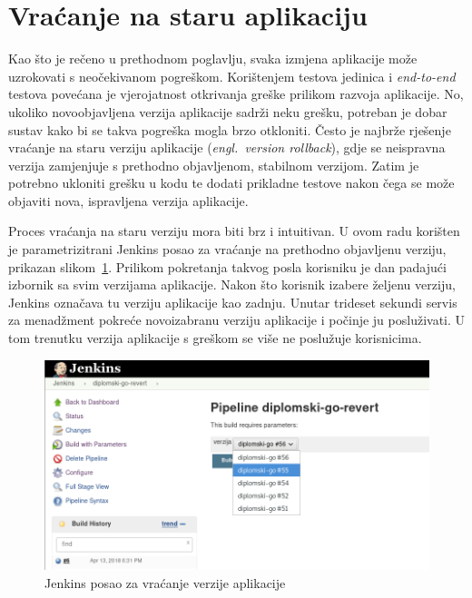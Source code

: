 \section{Vraćanje na staru aplikaciju}
Kao što je rečeno u prethodnom poglavlju, svaka izmjena aplikacije može uzrokovati s neočekivanom
pogreškom. Korištenjem testova jedinica i \textit{end-to-end} testova povećana je vjerojatnost
otkrivanja greške prilikom razvoja aplikacije. No, ukoliko novoobjavljena verzija aplikacije sadrži
neku grešku, potreban je dobar sustav kako bi se takva pogreška mogla brzo otkloniti. Često je
najbrže rješenje vraćanje na staru verziju aplikacije (\textit{engl.~version rollback}), gdje se
neispravna verzija zamjenjuje s prethodno objavljenom, stabilnom verzijom. Zatim je potrebno
ukloniti grešku u kodu te dodati prikladne testove nakon čega se može objaviti nova, ispravljena
verzija aplikacije.

Proces vraćanja na staru verziju mora biti brz i intuitivan. U ovom radu korišten je
parametrizitrani Jenkins posao za vraćanje na prethodno objavljenu verziju, prikazan
slikom~\ref{fig:04jenkins_rollback}. Prilikom pokretanja takvog posla korisniku je dan padajući
izbornik sa svim verzijama aplikacije. Nakon što korisnik izabere željenu verziju, Jenkins označava
tu verziju aplikacije kao zadnju. Unutar trideset sekundi servis za menadžment pokreće novoizabranu
verziju aplikacije i počinje ju posluživati. U tom trenutku verzija aplikacije s greškom se više ne
poslužuje korisnicima.

\begin{figure}[h]
    \centering
    \includegraphics[width=\textwidth]{img/04/jenkins_rollback.png}
    \caption{Jenkins posao za vraćanje verzije aplikacije}%
    \label{fig:04jenkins_rollback}
\end{figure}
